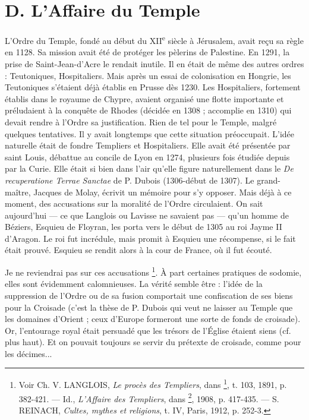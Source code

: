 \documentclass[french,twoside]{book} %
\begin{document}
\section[D. L’Affaire du Temple]{D. L’Affaire du Temple \protect\footnotemark}
\label{c06d}
\noindent L’Ordre du Temple, fondé au début du XII\textsuperscript{e} siècle à Jérusalem, avait reçu sa règle en 1128. Sa mission avait été de protéger les pèlerins de Palestine. En 1291, la prise de Saint-Jean-d’Acre le rendait inutile. Il en était de même des autres ordres : Teutoniques, Hospitaliers. Mais après un essai de colonisation en Hongrie, les Teutoniques s’étaient déjà établis en Prusse dès 1230. Les Hospitaliers, fortement établis dans le royaume de Chypre, avaient organisé une flotte importante et préludaient à la conquête de Rhodes (décidée en 1308 ; accomplie en 1310) qui devait rendre à l’Ordre sa justification. Rien de tel pour le Temple, malgré quelques tentatives. Il y avait longtemps que cette situation préoccupait. L’idée naturelle était de fondre Templiers et Hospitaliers. Elle avait été présentée par saint Louis, débattue au concile de Lyon en 1274, plusieurs fois étudiée depuis par la Curie. Elle était si bien dans l’air qu’elle figure naturellement dans le {\itshape De recuperatione Terrae Sanctae} de P. Dubois (1306-début de 1307). Le grand-maître, Jacques de Molay, écrivit un mémoire pour s’y opposer. Mais déjà à ce moment, des accusations sur la moralité de l’Ordre circulaient. On sait aujourd’hui — ce que Langlois ou Lavisse ne savaient pas — qu’un homme de Béziers, Esquieu de Floyran, les porta vers le début de 1305 au roi Jayme II d’Aragon. Le roi fut incrédule, mais promit à Esquieu une récompense, si le fait était prouvé. Esquieu se rendit alors à la cour de France, où il fut écouté.\par
Je ne reviendrai pas sur ces accusations \footnote{ Voir Ch. V. LANGLOIS, {\itshape Le procès des Templiers}, dans \href{http://gallica.bnf.fr/document?O=N087160}{}\footnote{\href{http://gallica.bnf.fr/document?O=N087160}{http://gallica.bnf.fr/document?O=N087160}}, t. 103, 1891, p. 382-421. — Id., {\itshape L’Affaire des Templiers}, dans \href{http://gallica.bnf.fr/document?O=N054717}{}\footnote{\href{http://gallica.bnf.fr/document?O=N054717}{http://gallica.bnf.fr/document?O=N054717}}, 1908, p. 417-435. — S. REINACH, {\itshape Cultes, mythes et religions}, t. IV, Paris, 1912, p. 252-3.}. À part certaines pratiques de sodomie, elles sont évidemment calomnieuses. La vérité semble être : l’idée de la suppression de l’Ordre ou de sa fusion comportait une confiscation de ses biens pour la Croisade (c’est la thèse de P. Dubois qui veut ne laisser au Temple que les domaines d’Orient ; ceux d’Europe formeront une sorte de fonds de croisade). Or, l’entourage royal était persuadé que les trésors de l’Église étaient siens (cf. plus haut). Et on pouvait toujours se servir du prétexte de croisade, comme pour les décimes...\par
\end{document}
